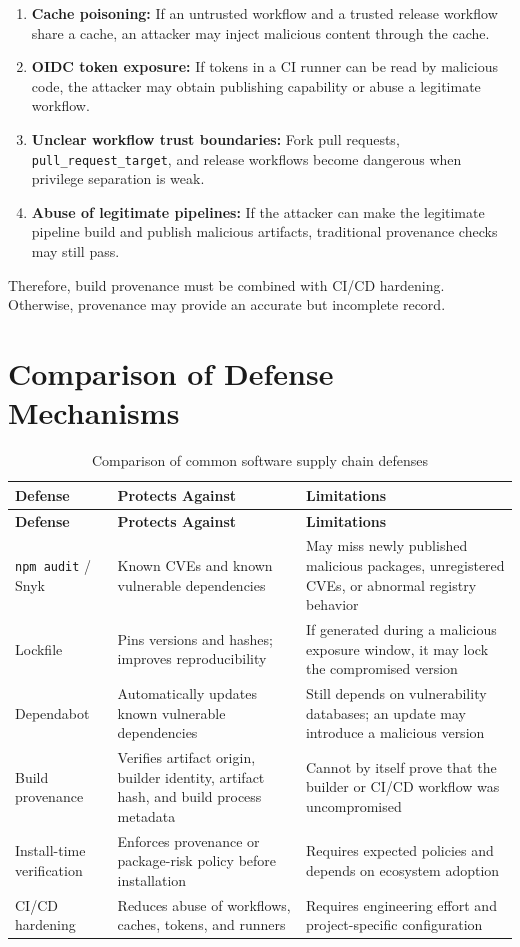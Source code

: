 \documentclass[12pt,a4paper]{article}
\begin{document}
\begin{enumerate}[label=(\arabic*)]
  \item \textbf{Cache poisoning:} If an untrusted workflow and a trusted release workflow share a cache, an attacker may inject malicious content through the cache.
  \item \textbf{OIDC token exposure:} If tokens in a CI runner can be read by malicious code, the attacker may obtain publishing capability or abuse a legitimate workflow.
  \item \textbf{Unclear workflow trust boundaries:} Fork pull requests, \texttt{pull\_request\_target}, and release workflows become dangerous when privilege separation is weak.
  \item \textbf{Abuse of legitimate pipelines:} If the attacker can make the legitimate pipeline build and publish malicious artifacts, traditional provenance checks may still pass.
\end{enumerate}

Therefore, build provenance must be combined with CI/CD hardening. Otherwise, provenance may provide an accurate but incomplete record.

\section{Comparison of Defense Mechanisms}

\begin{longtable}{P{3.2cm}P{5.2cm}P{6cm}}
\caption{Comparison of common software supply chain defenses}\\
\toprule
\textbf{Defense} & \textbf{Protects Against} & \textbf{Limitations} \\
\midrule
\endfirsthead
\toprule
\textbf{Defense} & \textbf{Protects Against} & \textbf{Limitations} \\
\midrule
\endhead
\texttt{npm audit} / Snyk & Known CVEs and known vulnerable dependencies & May miss newly published malicious packages, unregistered CVEs, or abnormal registry behavior \\
\addlinespace
Lockfile & Pins versions and hashes; improves reproducibility & If generated during a malicious exposure window, it may lock the compromised version \\
\addlinespace
Dependabot & Automatically updates known vulnerable dependencies & Still depends on vulnerability databases; an update may introduce a malicious version \\
\addlinespace
Build provenance & Verifies artifact origin, builder identity, artifact hash, and build process metadata & Cannot by itself prove that the builder or CI/CD workflow was uncompromised \\
\addlinespace
Install-time verification & Enforces provenance or package-risk policy before installation & Requires expected policies and depends on ecosystem adoption \\
\addlinespace
CI/CD hardening & Reduces abuse of workflows, caches, tokens, and runners & Requires engineering effort and project-specific configuration \\
\bottomrule
\end{longtable}
\end{document}
